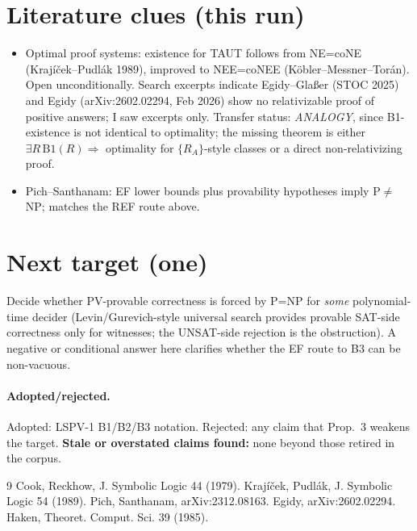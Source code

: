 \documentclass[11pt]{article}
\begin{document}
\section*{Literature clues (this run)}
\begin{itemize}
\item Optimal proof systems: existence for TAUT follows from NE=coNE (Krajíček--Pudlák 1989), improved to NEE=coNEE (Köbler--Messner--Torán). Open unconditionally. Search excerpts indicate Egidy--Glaßer (STOC 2025) and Egidy (arXiv:2602.02294, Feb 2026) show no relativizable proof of positive answers; I saw excerpts only. Transfer status: \emph{ANALOGY}, since B1-existence is not identical to optimality; the missing theorem is either $\exists R\,\mathrm{B1}(R)\Rightarrow$ optimality for $\{R_A\}$-style classes or a direct non-relativizing proof.
\item Pich--Santhanam: EF lower bounds plus provability hypotheses imply P$\neq$NP; matches the REF route above.
\end{itemize}

\section*{Next target (one)}
Decide whether PV-provable correctness is forced by P=NP for \emph{some} polynomial-time decider (Levin/Gurevich-style universal search provides provable SAT-side correctness only for witnesses; the UNSAT-side rejection is the obstruction). A negative or conditional answer here clarifies whether the EF route to B3 can be non-vacuous.

\paragraph{Adopted/rejected.} Adopted: LSPV-1 B1/B2/B3 notation. Rejected: any claim that Prop.~3 weakens the target. \textbf{Stale or overstated claims found:} none beyond those retired in the corpus.

\begin{thebibliography}{9}
 Cook, Reckhow, J. Symbolic Logic 44 (1979).
 Krajíček, Pudlák, J. Symbolic Logic 54 (1989).
 Pich, Santhanam, arXiv:2312.08163.
 Egidy, arXiv:2602.02294.
 Haken, Theoret. Comput. Sci. 39 (1985).
\end{thebibliography}
\end{document}
